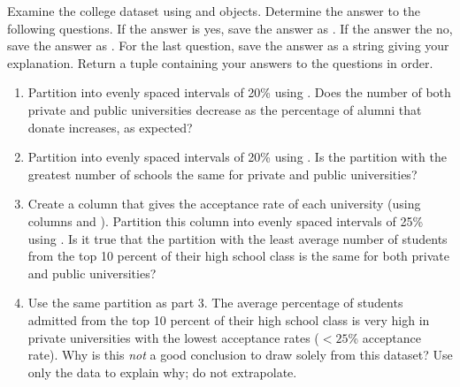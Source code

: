 \begin{problem}
Examine the college dataset using  and  objects.
Determine the answer to the following questions.
If the answer is yes, save the answer as .
If the answer the no, save the answer as .
For the last question, save the answer as a string giving your explanation.
Return a tuple containing your answers to the questions in order.

\begin{enumerate}
\item Partition  into evenly spaced intervals of 20\% using .
Does the number of both private and public universities decrease as the percentage of alumni that donate increases, as expected?

\item Partition  into evenly spaced intervals of 20\% using .
Is the partition with the greatest number of schools the same for private and public universities?

\item Create a column that gives the acceptance rate of each university (using columns  and ).
Partition this column into evenly spaced intervals of 25\% using .
Is it true that the partition with the least average number of students from the top 10 percent of their high school class is the same for both private and public universities?

\item Use the same partition as part 3.
The average percentage of students admitted from the top 10 percent of their high school class is very high in private universities with the lowest acceptance rates ($<25$\% acceptance rate). 
Why is this \emph{not} a good conclusion to draw solely from this dataset? 
Use only the data to explain why; do not extrapolate.
\end{enumerate}
\end{problem}





